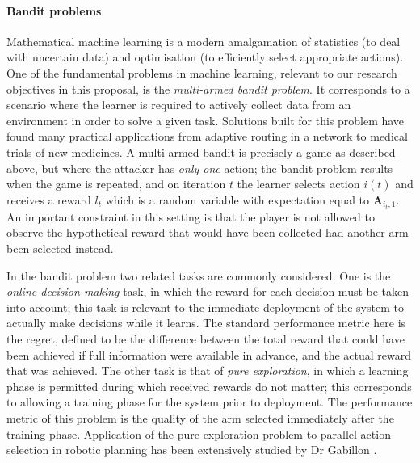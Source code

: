 \paragraph{Bandit problems}
Mathematical machine learning is a modern amalgamation of statistics (to deal with uncertain data) and optimisation (to efficiently select appropriate actions).   	
One of the fundamental problems in machine learning, relevant to our research objectives in this proposal, is the \textit{multi-armed bandit problem}. It corresponds to a scenario where the learner is required to actively collect data from an environment in order to solve a given task. Solutions built for this problem have found many practical applications from adaptive routing in a network to medical trials of new medicines\cite{bubeck2012regret}.
A multi-armed bandit is precisely a game as described above, but where the attacker has \textit{only one} action; the bandit problem results when the game is repeated, and on iteration $t$ the learner selects action $i(t)$ and receives a reward $l_t$ which is a random variable with expectation equal to $\boldsymbol A_{i_t,1}$.
An important constraint in this setting is that the player is not allowed to observe the hypothetical reward that would have been collected had another arm been selected instead.

In the bandit problem two related tasks are commonly considered.  One is the {\em online decision-making} task, in which the reward for each decision must be taken into account; this task is relevant to the immediate deployment of the system to actually make decisions while it learns.  The standard performance metric here is the regret, defined to be the difference between the total reward that could have been achieved if full information were available in advance, and the actual reward that was achieved.  The other task is that of {\em pure exploration}, in which a learning phase is permitted during which received rewards do not matter; this corresponds to allowing a training phase for the system prior to deployment.  The performance metric of this problem is the quality of the arm selected immediately after the training phase.  Application of the pure-exploration problem to parallel action selection in robotic planning has been extensively studied by Dr Gabillon \cite{Gabillon11MB}. 

